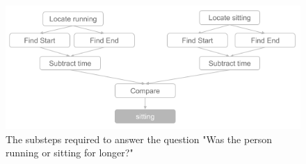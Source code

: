\begin{figure}[t]
\begin{center}
\includegraphics[width=0.8\linewidth]{Figures/figure_composition.png}
\end{center}
   \caption{The substeps required to answer the question "Was the person running or sitting for longer?"}
\label{compositional_substeps}
\end{figure}






